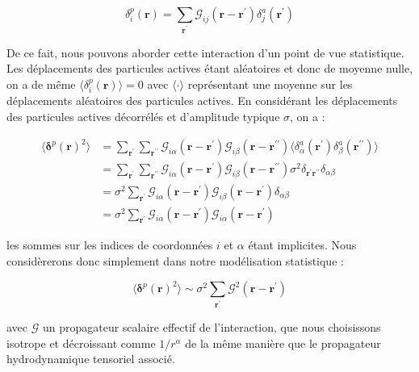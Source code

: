 \begin{equation}
	\delta^p_i(\mathbf{r}) = \sum_{\mathbf{r}^\prime}\mathcal{G}_{ij}(\mathbf{r}-\mathbf{r}^\prime)\delta^a_j(\mathbf{r}^\prime)
\end{equation}

\noindent De ce fait, nous pouvons aborder cette interaction d'un point de vue statistique. Les déplacements des particules actives étant aléatoires et donc de moyenne nulle, on a de même $\langle \delta^p_i(\mathbf{r}) \rangle = 0$ avec $\langle \cdot \rangle$ représentant une moyenne sur les déplacements aléatoires des particules actives. En considérant les déplacements des particules actives décorrélés et d'amplitude typique $\sigma$, on a :

\begin{equation}
\begin{aligned}
	\langle\boldsymbol\delta^p(\mathbf{r})^2\rangle &= \sum_{\mathbf{r}^\prime}\sum_{\mathbf{r}^{\prime\prime}}\mathcal{G}_{i\alpha}(\mathbf{r}-\mathbf{r}^\prime)\mathcal{G}_{i\beta}(\mathbf{r}-\mathbf{r}^{\prime\prime})\langle\delta^a_\alpha(\mathbf{r}^\prime)\delta^a_\beta(\mathbf{r}^{\prime\prime})\rangle \\
	&= \sum_{\mathbf{r}^\prime}\sum_{\mathbf{r}^{\prime\prime}}\mathcal{G}_{i\alpha}(\mathbf{r}-\mathbf{r}^\prime)\mathcal{G}_{i\beta}(\mathbf{r}-\mathbf{r}^{\prime\prime})\sigma^2\delta_{\mathbf{r}^\prime\mathbf{r}^{\prime\prime}}\delta_{\alpha\beta}\\
	&= \sigma^2\sum_{\mathbf{r}^\prime}\mathcal{G}_{i\alpha}(\mathbf{r}-\mathbf{r}^\prime)\mathcal{G}_{i\beta}(\mathbf{r}-\mathbf{r}^{\prime})\delta_{\alpha\beta}\\
	&= \sigma^2 \sum_{\mathbf{r}^\prime}\mathcal{G}_{i\alpha}(\mathbf{r}-\mathbf{r}^\prime)\mathcal{G}_{i\alpha}(\mathbf{r}-\mathbf{r}^{\prime})
\end{aligned}
\end{equation}

\noindent les sommes sur les indices de coordonnées $i$ et $\alpha$ étant implicites. Nous considèrerons donc simplement dans notre modélisation statistique :

\begin{equation}
	\langle \boldsymbol\delta^p(\mathbf{r})^2 \rangle \sim \sigma^2 \sum_{\mathbf{r}^\prime} \mathcal{G}^2(\mathbf{r}-\mathbf{r}^\prime)
	\label{eq:convol_model}
\end{equation}

\noindent avec $\mathcal{G}$ un propagateur scalaire effectif de l'interaction, que nous choisissons isotrope et décroissant comme $1/r^{\alpha}$ de la même manière que le propagateur hydrodynamique tensoriel associé.

